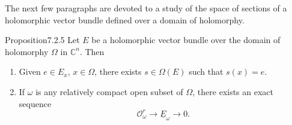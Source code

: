 The next few paragraphs are devoted to a study of the space of sections of a holomorphic vector bundle defined over a domain of holomorphy.
\begin{originaltheorem}{Proposition}{7.2.5}
Let $E$ be a holomorphic vector bundle over the domain of holomorphy $\Omega$ in $\mathbb{C}^n$. Then
\begin{enumerate}[label=\arabic*.]
\item Given $e\in E_x$, $x\in\Omega$, there exists $s\in\Omega(E)$ such that $s(x)=e$.
\item If $\omega$ is any relatively compact open subset of $\Omega$, there exists an exact sequence
\[
\mathcal{O}_\omega^r\to\underline E_\omega\to0.
\]
\end{enumerate}
\end{originaltheorem}

